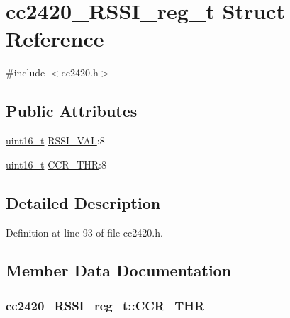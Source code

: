 \hypertarget{structcc2420___r_s_s_i__reg__t}{}\section{cc2420\+\_\+\+R\+S\+S\+I\+\_\+reg\+\_\+t Struct Reference}
\label{structcc2420___r_s_s_i__reg__t}


{\ttfamily \#include $<$cc2420.\+h$>$}

\subsection*{Public Attributes}
\begin{DoxyCompactItemize}
\item 
\hyperlink{_p_e___types_8h_a1f1825b69244eb3ad2c7165ddc99c956}{uint16\+\_\+t} \hyperlink{structcc2420___r_s_s_i__reg__t_a6e2411ab9a12bd709d7933049a5d1186}{R\+S\+S\+I\+\_\+\+V\+AL}\+:8
\item 
\hyperlink{_p_e___types_8h_a1f1825b69244eb3ad2c7165ddc99c956}{uint16\+\_\+t} \hyperlink{structcc2420___r_s_s_i__reg__t_a5c79c71da9be63c0eebbdcaa310422b2}{C\+C\+R\+\_\+\+T\+HR}\+:8
\end{DoxyCompactItemize}


\subsection{Detailed Description}


Definition at line 93 of file cc2420.\+h.



\subsection{Member Data Documentation}
\subsubsection[{\texorpdfstring{C\+C\+R\+\_\+\+T\+HR}{CCR_THR}}]{ cc2420\+\_\+\+R\+S\+S\+I\+\_\+reg\+\_\+t\+::\+C\+C\+R\+\_\+\+T\+HR}\hypertarget{structcc2420___r_s_s_i__reg__t_a5c79c71da9be63c0eebbdcaa310422b2}{}\label{structcc2420___r_s_s_i__reg__t_a5c79c71da9be63c0eebbdcaa310422b2}



